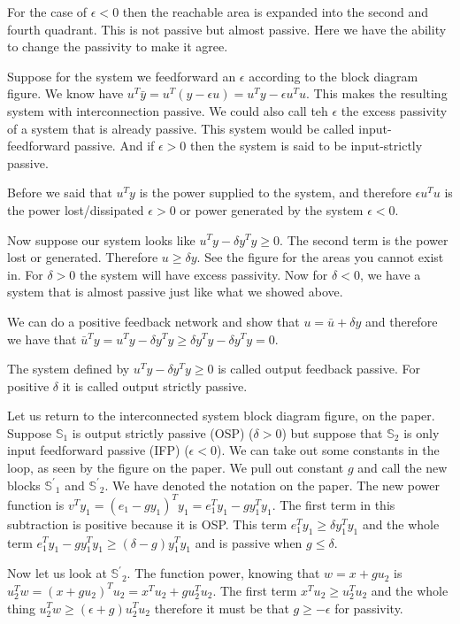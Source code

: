 \documentclass[11pt]{article}
\begin{document}
For the case of $\epsilon < 0$ then the reachable area is expanded into the second and fourth quadrant. This is not passive but almost passive. Here we have the ability to change the passivity to make it agree.

Suppose for the system we feedforward an $\epsilon$ according to the block diagram figure. We know have $u^T \bar{y} = u^T(y - \epsilon u) = u^Ty - \epsilon u^Tu$. This makes the resulting system with interconnection passive. We could also call teh $\epsilon$ the excess passivity of a system that is already passive. This system would be called input-feedforward passive. And if $\epsilon > 0$ then the system is said to be input-strictly passive.

Before we said that $u^Ty$ is the power supplied to the system, and therefore $\epsilon u^Tu$ is the power lost/dissipated $\epsilon >0$ or power generated by the system $\epsilon < 0$.

Now suppose our system looks like $u^Ty - \delta y^Ty \geq 0$. The second term is the power lost or generated. Therefore $u \geq \delta y$. See the figure for the areas you cannot exist in. For $\delta > 0$ the system will have excess passivity. Now for $\delta < 0$, we have a system that is almost passive just like what we showed above.

We can do a positive feedback network and show that $u = \bar{u} + \delta y$ and therefore we have that $\bar{u}^Ty = u^Ty - \delta y^Ty \geq \delta y^Ty - \delta y^Ty =0$.

The system defined by $u^Ty - \delta y^Ty \geq 0$ is called output feedback passive. For positive $\delta$ it is called output strictly passive.

Let us return to the interconnected system block diagram figure, on the paper. Suppose $\mathbb{S}_1$ is output strictly passive (OSP) ($\delta > 0$) but suppose that  $\mathbb{S}_2$ is only input feedforward passive (IFP) ($\epsilon < 0$). We can take out some constants in the loop, as seen by the figure on the paper. We pull out constant $g$ and call the new blocks $\mathbb{S^\prime}_1$ and $\mathbb{S^\prime}_2$. We have denoted the notation on the paper. The new power function is $v^Ty_1 = (e_1 - gy_1)^Ty_1 = e_1^Ty_1 - gy_1^Ty_1$. The first term in this subtraction is positive because it is OSP. This term $e_1^Ty_1 \geq \delta y_1^Ty_1$ and the whole term $e_1^Ty_1 - gy_1^Ty_1 \geq (\delta - g)y_1^Ty_1$ and is passive when $g \leq \delta$.

Now let us look at  $\mathbb{S^\prime}_2$. The function power, knowing that $w = x + gu_2$ is $u_2^Tw = (x + gu_2)^Tu_2 = x^Tu_2 + gu_2^Tu_2 $. The first term $x^Tu_2 \geq u_2^Tu_2$ and the whole thing $u_2^Tw \geq (\epsilon + g) u_2^Tu_2$ therefore it must be that $g \geq - \epsilon$ for passivity.
\end{document}
